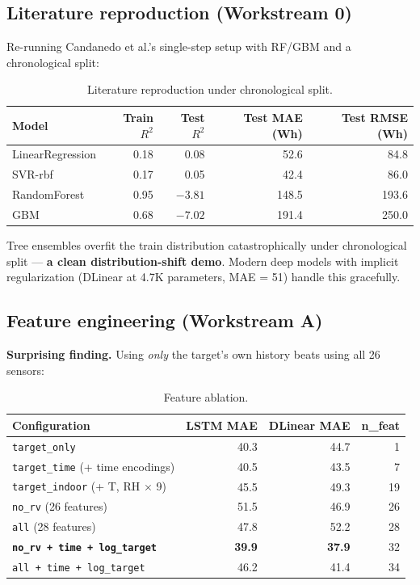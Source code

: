 \documentclass[11pt,letterpaper]{article}
\begin{document}
\subsection{Literature reproduction (Workstream 0)}

Re-running Candanedo et al.'s single-step setup with RF/GBM and a
chronological split:

\begin{table}[H]
\centering
\small
\begin{tabular}{lrrrr}
\toprule
\textbf{Model} & \textbf{Train $R^2$} & \textbf{Test $R^2$} & \textbf{Test MAE (Wh)} & \textbf{Test RMSE (Wh)} \\
\midrule
LinearRegression & 0.18 & 0.08          & 52.6  & 84.8  \\
SVR-rbf          & 0.17 & 0.05          & 42.4  & 86.0  \\
RandomForest     & 0.95 & $\mathbf{-3.81}$ & 148.5 & 193.6 \\
GBM              & 0.68 & $\mathbf{-7.02}$ & 191.4 & 250.0 \\
\bottomrule
\end{tabular}
\caption{Literature reproduction under chronological split.}
\end{table}

Tree ensembles overfit the train distribution catastrophically under
chronological split --- \textbf{a clean distribution-shift demo}. Modern
deep models with implicit regularization (DLinear at 4.7K parameters,
MAE = 51) handle this gracefully.

\subsection{Feature engineering (Workstream A)}

\textbf{Surprising finding.} Using \emph{only} the target's own history
beats using all 26 sensors:

\begin{table}[H]
\centering
\small
\begin{tabular}{lrrr}
\toprule
\textbf{Configuration} & \textbf{LSTM MAE} & \textbf{DLinear MAE} & \textbf{n\_feat} \\
\midrule
\texttt{target\_only}                           & 40.3 & 44.7 & 1  \\
\texttt{target\_time} (+ time encodings)        & 40.5 & 43.5 & 7  \\
\texttt{target\_indoor} (+ T, RH $\times$ 9)    & 45.5 & 49.3 & 19 \\
\texttt{no\_rv} (26 features)                   & 51.5 & 46.9 & 26 \\
\texttt{all} (28 features)                      & 47.8 & 52.2 & 28 \\
\textbf{\texttt{no\_rv + time + log\_target}}   & \textbf{39.9} & \textbf{37.9} & 32 \\
\texttt{all + time + log\_target}               & 46.2 & 41.4 & 34 \\
\bottomrule
\end{tabular}
\caption{Feature ablation.}
\end{table}
\end{document}
